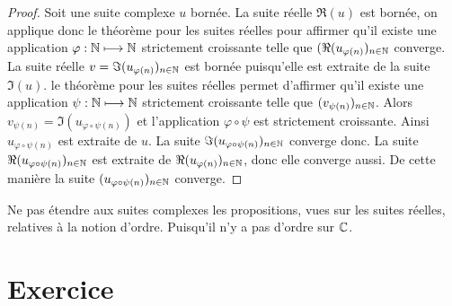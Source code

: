         \begin{proof}
          Soit une suite complexe \(u\) bornée. La suite réelle \(\Re(u)\) est 
          bornée, on applique donc le théorème pour les suites réelles pour 
          affirmer qu'il existe une application \(\varphi:\mathbb{N} \longmapsto \mathbb{N}\) 
          strictement croissante telle que \((\Re(u_{\varphi(n)})_{n \in \mathbb{N}}\) 
          converge. La suite réelle \(v = \Im(u_{\varphi(n)})_{n \in \mathbb{N}}\) est 
          bornée puisqu'elle est extraite de la suite \(\Im(u)\). le théorème 
          pour les suites réelles permet d'affirmer qu'il existe une application 
          \(\psi:\mathbb{N} \longmapsto \mathbb{N}\) strictement croissante telle que 
          \((v_{\psi(n)})_{n \in \mathbb{N}}\). Alors \(v_{\psi(n)} = \Im(u_{\varphi 
          \circ \psi(n)})\) et l'application \(\varphi \circ \psi\) est 
          strictement croissante. Ainsi \(u_{\varphi \circ \psi(n)}\) est 
          extraite de \(u\). La suite \(\Im(u_{\varphi \circ \psi(n)})_{n \in 
          \mathbb{N}}\) converge donc. La suite \(\Re(u_{\varphi \circ \psi(n)})_{n \in 
          \mathbb{N}}\) est extraite de \(\Re(u_{\varphi(n)})_{n \in \mathbb{N}}\), donc elle 
          converge aussi. De cette manière la suite \((u_{\varphi \circ 
          \psi(n)})_{n \in \mathbb{N}}\) converge.
        \end{proof}

        Ne pas étendre aux suites complexes les propositions, vues sur les 
        suites réelles, relatives à la notion d'ordre. Puisqu'il n'y a pas 
        d'ordre sur \(\mathbb{C}\).

        \section{Exercice}
